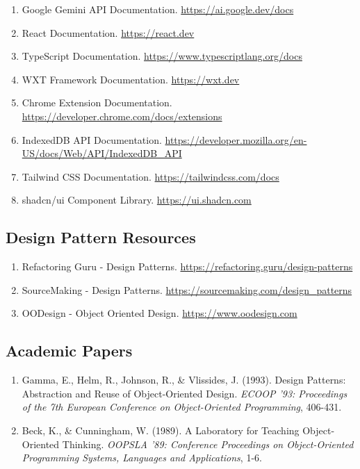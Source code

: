 \documentclass[11pt, a4paper]{article}
\theoremstyle{plain}
\theoremstyle{definition}
\begin{document}
\begin{enumerate}
    \item Google Gemini API Documentation. \url{https://ai.google.dev/docs}
    
    \item React Documentation. \url{https://react.dev}
    
    \item TypeScript Documentation. \url{https://www.typescriptlang.org/docs}
    
    \item WXT Framework Documentation. \url{https://wxt.dev}
    
    \item Chrome Extension Documentation. \url{https://developer.chrome.com/docs/extensions}
    
    \item IndexedDB API Documentation. \url{https://developer.mozilla.org/en-US/docs/Web/API/IndexedDB_API}
    
    \item Tailwind CSS Documentation. \url{https://tailwindcss.com/docs}
    
    \item shadcn/ui Component Library. \url{https://ui.shadcn.com}
\end{enumerate}

\subsection{Design Pattern Resources}

\begin{enumerate}
    \item Refactoring Guru - Design Patterns. \url{https://refactoring.guru/design-patterns}
    
    \item SourceMaking - Design Patterns. \url{https://sourcemaking.com/design_patterns}
    
    \item OODesign - Object Oriented Design. \url{https://www.oodesign.com}
\end{enumerate}

\subsection{Academic Papers}

\begin{enumerate}
    \item Gamma, E., Helm, R., Johnson, R., \& Vlissides, J. (1993). Design Patterns: Abstraction and Reuse of Object-Oriented Design. \textit{ECOOP '93: Proceedings of the 7th European Conference on Object-Oriented Programming}, 406-431.
    
    \item Beck, K., \& Cunningham, W. (1989). A Laboratory for Teaching Object-Oriented Thinking. \textit{OOPSLA '89: Conference Proceedings on Object-Oriented Programming Systems, Languages and Applications}, 1-6.
\end{enumerate}
\end{document}
